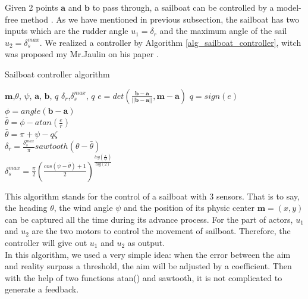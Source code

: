 \documentclass[a4paper]{report}
\begin{document}
Given 2 points $\mathbf{a}$ and $\mathbf{b}$ to pass through, a sailboat can be controlled by a model-free method \cite{robmob}. As we have mentioned in previous subsection, the sailboat has two inputs which are the rudder angle $u_1 = \delta_r$ and the maximum angle of the sail $u_2 =\delta_s^{max}$. We realized a controller by Algorithm \ref{alg_sailboat_controller}, witch was proposed my Mr.Jaulin on his paper \cite{jaulin2013interval}.\\

\begin{algorithm}

\centering
\caption{Sailboat controller algorithm}
\label{alg_sailboat_controller}
\begin{algorithmic}[1] %
\REQUIRE $\mathbf{m}$,$\theta$, $\psi$, $\mathbf{a}$, $\mathbf{b}$, $q$
\ENSURE $\delta_r$,$\delta_s^{max}$, $q$
\STATE $e=det(\frac{\mathbf{b}-\mathbf{a}}{||\mathbf{b}-\mathbf{a}||},\mathbf{m}-\mathbf{a})$
	\STATE $q=sign(e)$ \\
\ENDIF
\STATE $\phi=angle(\mathbf{b}-\mathbf{a})$\\
\STATE $\bar{\theta}=\phi-atan(\frac{e}{r})$\\
	\STATE $\bar{\theta}=\pi+\psi-q\zeta$ \\
\ENDIF
\STATE $\delta_r=\frac{\delta_s^{max}}{\pi}sawtooth(\theta-\bar{\theta})$\\
\STATE $\delta_s^{max}=\frac{\pi}{2}(\frac{cos(\psi-\bar{\theta})+1}{2})^\frac{log(\frac{\pi}{2\beta})}{log(2)}$\\

\end{algorithmic} 
\end{algorithm}

This algorithm stands for the control of a sailboat with 3 sensors. That is to say, the heading $\theta$, the wind angle $\psi$ and the position of its physic center $\mathbf{m}=(x,y)$ can be captured all the time during its advance process. For the part of actors, $u_1$ and $u_2$ are the two motors to control the movement of sailboat. Therefore, the controller will give out $u_1$ and $u_2$ as output.\\

In this algorithm, we used a very simple idea: when the error between the aim and reality surpass a threshold, the aim will be adjusted by a coefficient. Then with the help of two functions atan() and sawtooth, it is not complicated to generate a feedback.\\
\end{document}
